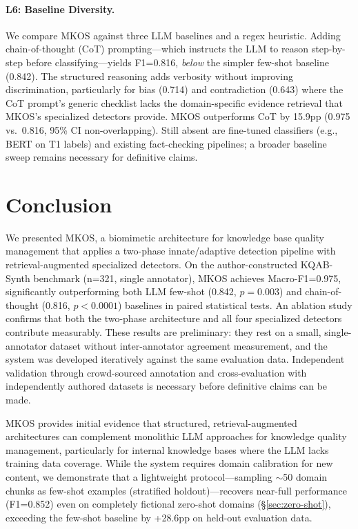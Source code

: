 \documentclass[11pt]{article}
\begin{document}
\paragraph{L6: Baseline Diversity.} We compare MKOS against three LLM baselines and a regex heuristic. Adding chain-of-thought (CoT) prompting---which instructs the LLM to reason step-by-step before classifying---yields F1=0.816, \emph{below} the simpler few-shot baseline (0.842). The structured reasoning adds verbosity without improving discrimination, particularly for bias (0.714) and contradiction (0.643) where the CoT prompt's generic checklist lacks the domain-specific evidence retrieval that MKOS's specialized detectors provide. MKOS outperforms CoT by 15.9pp (0.975 vs.\ 0.816, 95\% CI non-overlapping). Still absent are fine-tuned classifiers (e.g., BERT on T1 labels) and existing fact-checking pipelines; a broader baseline sweep remains necessary for definitive claims.

\section{Conclusion}
\label{sec:conclusion}

We presented MKOS, a biomimetic architecture for knowledge base quality management that applies a two-phase innate/adaptive detection pipeline with retrieval-augmented specialized detectors. On the author-constructed KQAB-Synth benchmark (n=321, single annotator), MKOS achieves Macro-F1=0.975, significantly outperforming both LLM few-shot (0.842, $p{=}0.003$) and chain-of-thought (0.816, $p{<}0.0001$) baselines in paired statistical tests. An ablation study confirms that both the two-phase architecture and all four specialized detectors contribute measurably. These results are preliminary: they rest on a small, single-annotator dataset without inter-annotator agreement measurement, and the system was developed iteratively against the same evaluation data. Independent validation through crowd-sourced annotation and cross-evaluation with independently authored datasets is necessary before definitive claims can be made.

MKOS provides initial evidence that structured, retrieval-augmented architectures can complement monolithic LLM approaches for knowledge quality management, particularly for internal knowledge bases where the LLM lacks training data coverage. While the system requires domain calibration for new content, we demonstrate that a lightweight protocol---sampling $\sim$50 domain chunks as few-shot examples (stratified holdout)---recovers near-full performance (F1=0.852) even on completely fictional zero-shot domains (\S\ref{sec:zero-shot}), exceeding the few-shot baseline by +28.6pp on held-out evaluation data.
\end{document}
